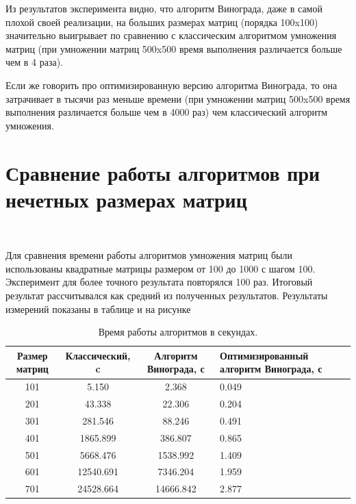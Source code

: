 \documentclass[12pt]{report}
\begin{document}

Из результатов эксперимента видно, что алгоритм Винограда, даже в самой плохой своей реализации, на больших размерах матриц (порядка 100x100) значительно выигрывает по сравнению с классическим алгоритмом умножения матриц (при умножении матриц 500x500 время выполнения различается больше чем в 4 раза).

Если же говорить про оптимизированную версию алгоритма Винограда, то она затрачивает в тысячи раз меньше времени (при умножении матриц 500x500 время выполнения различается больше чем в 4000 раз) чем классический алгоритм умножения. 
	
	\section{Сравнение работы алгоритмов при нечетных размерах матриц}
	
	~\
	
	Для сравнения времени работы алгоритмов умножения матриц были использованы квадратные матрицы размером от 100 до 1000 с шагом 100. Эксперимент для более точного результата повторялся 100 раз. Итоговый результат рассчитывался как средний из полученных результатов. Результаты измерений показаны в таблице и на рисунке 
	
	\begin{table}[h]
		\caption{\label{tab:time2} Время работы алгоритмов в секундах. }
		\begin{center}
			\begin{tabular}{|c|c|c|p{3.8cm}|}
				\hline
				Размер матриц & Классический, c & Алгоритм Винограда, с & Оптимизированный алгоритм Винограда, с \\ [0.5ex] 
				\hline
				101 & 5.150 & 2.368 & 0.049\\
				\hline
				201 & 43.338 & 22.306 & 0.204\\
				\hline
				301 & 281.546 & 88.246 & 0.491\\
				\hline
				401 & 1865.899 & 386.807 & 0.865\\
				\hline
				501 & 5668.476 & 1538.992 & 1.409\\
				\hline
				601 & 12540.691 & 7346.204 & 1.959\\
				\hline
				701 & 24528.664 & 14666.842 & 2.877\\
				\hline
			\end{tabular}
		\end{center}
	\end{table}
\end{document}

